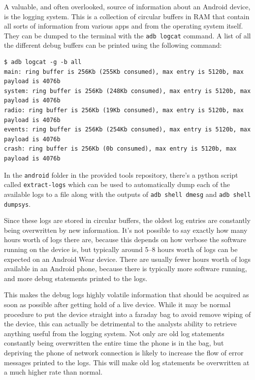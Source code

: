 \documentclass[a4paper,11pt,dvips]{article}
\begin{document}
A valuable, and often overlooked, source of information about an Android device, is the logging system. This is a collection of circular buffers in RAM that contain all sorts of information from various apps and from the operating system itself. They can be dumped to the terminal with the \texttt{adb logcat} command. A list of all the different debug buffers can be printed using the following command:

\scriptsize
\begin{verbatim}
$ adb logcat -g -b all
main: ring buffer is 256Kb (255Kb consumed), max entry is 5120b, max payload is 4076b
system: ring buffer is 256Kb (248Kb consumed), max entry is 5120b, max payload is 4076b
radio: ring buffer is 256Kb (19Kb consumed), max entry is 5120b, max payload is 4076b
events: ring buffer is 256Kb (254Kb consumed), max entry is 5120b, max payload is 4076b
crash: ring buffer is 256Kb (0b consumed), max entry is 5120b, max payload is 4076b
\end{verbatim}
\normalsize

In the \texttt{android} folder in the provided tools repository, there's a python script called \texttt{extract-logs} which can be used to automatically dump each of the available logs to a file along with the outputs of \texttt{adb shell dmesg} and \texttt{adb shell dumpsys}.

Since these logs are stored in circular buffers, the oldest log entries are constantly being overwritten by new information. It's not possible to say exactly how many hours worth of logs there are, because this depends on how verbose the software running on the device is, but typically around 5--8 hours worth of logs can be expected on an Android Wear device. There are usually fewer hours worth of logs available in an Android phone, because there is typically more software running, and more debug statements printed to the logs.

This makes the debug logs highly volatile information that should be acquired as soon as possible after getting hold of a live device. While it may be normal procedure to put the device straight into a faraday bag to avoid remove wiping of the device, this can actually be detrimental to the analysts ability to retrieve anything useful from the logging system. Not only are old log statements constantly being overwritten the entire time the phone is in the bag, but depriving the phone of network connection is likely to increase the flow of error messages printed to the logs. This will make old log statements be overwritten at a much higher rate than normal.
\end{document}
